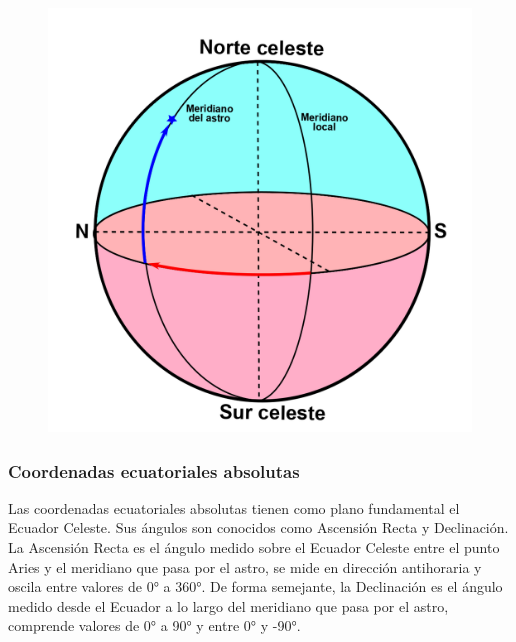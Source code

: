\documentclass[10pt,a4paper]{article}
\begin{document}
\begin{figure}[H]
\centering
\includegraphics[scale=0.3]{Imagenes/C_Ecua_horarias_01}
\end{figure}

\subsubsection{Coordenadas ecuatoriales absolutas}
Las coordenadas ecuatoriales absolutas tienen como plano fundamental el Ecuador Celeste. Sus ángulos son conocidos como Ascensión Recta y Declinación. La Ascensión Recta es el ángulo medido sobre el Ecuador Celeste entre el punto Aries y el meridiano que pasa por el astro, se mide en dirección antihoraria y oscila entre valores de 0° a 360°. De forma semejante, la Declinación es el ángulo medido desde el Ecuador a lo largo del meridiano que pasa por el astro, comprende valores de 0° a 90° y entre 0° y -90°.
\end{document}
